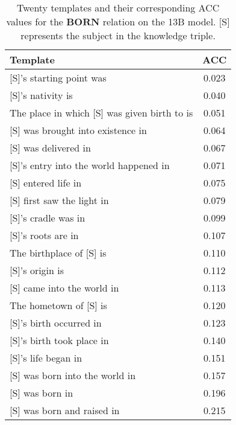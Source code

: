 \begin{table}[h]
\caption{Twenty templates and their corresponding ACC values for the \(\mathbf{BORN}\) relation on the 13B model. {[S]} represents the subject in the knowledge triple.}
\label{templates}
\vskip 0.15in
\begin{center}
\begin{small}
\begin{tabular}{p{6.6cm}c}
\toprule
Template & ACC \\
\midrule
{[S]}’s starting point was & 0.023 \\
{[S]}’s nativity is & 0.040 \\
The place in which {[S]} was given birth to is & 0.051 \\
{[S]} was brought into existence in & 0.064 \\
{[S]} was delivered in & 0.067 \\
{[S]}’s entry into the world happened in & 0.071 \\
{[S]} entered life in & 0.075 \\
{[S]} first saw the light in & 0.079 \\
{[S]}’s cradle was in & 0.099 \\
{[S]}’s roots are in & 0.107 \\
The birthplace of {[S]} is & 0.110 \\
{[S]}’s origin is & 0.112 \\
{[S]} came into the world in & 0.113 \\
The hometown of {[S]} is & 0.120 \\
{[S]}’s birth occurred in & 0.123 \\
{[S]}’s birth took place in & 0.140 \\
{[S]}’s life began in & 0.151 \\
{[S]} was born into the world in & 0.157 \\
{[S]} was born in & 0.196 \\
{[S]} was born and raised in & 0.215 \\
\bottomrule
\end{tabular}
\end{small}
\end{center}
\end{table}